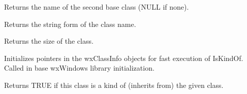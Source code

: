 Returns the name of the second base class (NULL if none).



Returns the string form of the class name.



Returns the size of the class.



Initializes pointers in the wxClassInfo objects for fast execution
of IsKindOf. Called in base wxWindows library initialization.

\label{wxclassinfoiskindof}


Returns TRUE if this class is a kind of (inherits from) the given class.


